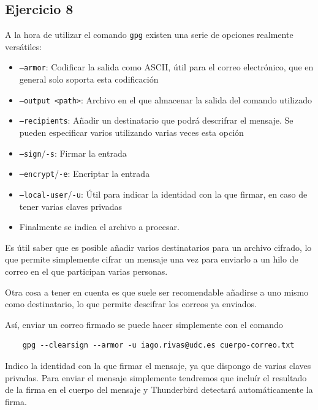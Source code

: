 \subsection{Ejercicio 8}
\graphicspath{ {img/08} }

A la hora de utilizar el comando \texttt{gpg} existen una serie de opciones realmente versátiles:

\begin{itemize}
    \item{\texttt{--armor}: Codificar la salida como ASCII, útil para el correo electrónico, que en general solo soporta esta codificación}
    \item{\texttt{--output <path>}: Archivo en el que almacenar la salida del comando utilizado}
    \item{\texttt{--recipients}: Añadir un destinatario que podrá descrifrar el mensaje. Se pueden especificar varios utilizando varias veces esta opción}
    \item{\texttt{--sign}/\texttt{-s}: Firmar la entrada}
    \item{\texttt{--encrypt}/\texttt{-e}: Encriptar la entrada}
    \item{\texttt{--local-user}/\texttt{-u}: Útil para indicar la identidad con la que firmar, en caso de tener varias claves privadas}
    \item{Finalmente se indica el archivo a procesar.}
\end{itemize}

Es útil saber que es posible añadir varios destinatarios para un archivo cifrado, lo que permite simplemente cifrar un mensaje una vez para enviarlo a un hilo de correo en el que participan varias personas.

Otra cosa a tener en cuenta es que suele ser recomendable añadirse a uno mismo como destinatario, lo que permite descifrar los correos ya enviados.

Así, enviar un correo firmado se puede hacer simplemente con el comando

\begin{verbatim}
    gpg --clearsign --armor -u iago.rivas@udc.es cuerpo-correo.txt
\end{verbatim}

Indico la identidad con la que firmar el mensaje, ya que dispongo de varias claves privadas. Para enviar el mensaje simplemente tendremos que incluír el resultado de la firma en el cuerpo del mensaje y Thunderbird detectará automáticamente la firma.

